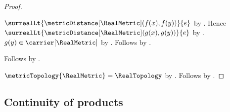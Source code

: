 \begin{proof}
\begin{subproof}
\begin{subproof}
            $\surrealLt{\metricDistance[\RealMetric](f(x),f(y))}{e}$
                by .
            Hence
                $\surrealLt{\metricDistance[\RealMetric](g(x),g(y))}{e}$
                by
                .
            $g(y)\in\carrier[\RealMetric]$
                by .
            Follows by .
        \end{subproof}
        Follows by \auto.
    \end{subproof}
    $\metricTopology{\RealMetric}=\RealTopology$
        by .
    Follows by .
\end{proof}

\subsection{Continuity of products}

